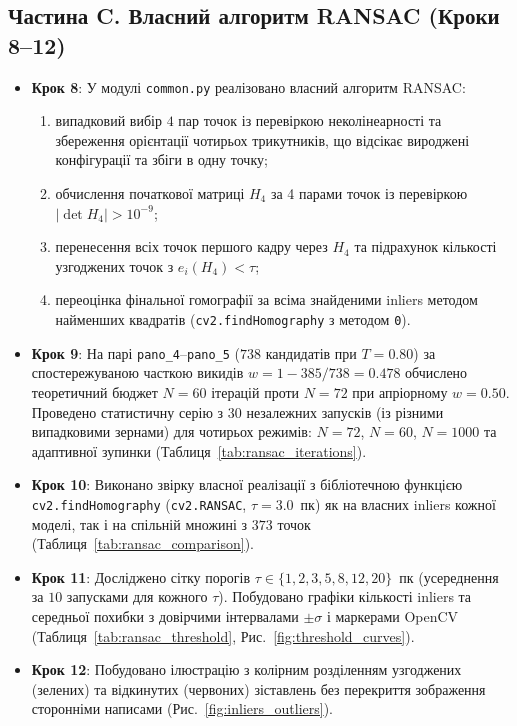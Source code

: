 \documentclass[14pt, a4paper]{extarticle}
\begin{document}
\subsection{Частина C. Власний алгоритм RANSAC (Кроки 8--12)}
\begin{itemize}
    \item \textbf{Крок 8}: У модулі \texttt{common.py} реалізовано власний алгоритм RANSAC:
    \begin{enumerate}
        \item випадковий вибір $4$ пар точок із перевіркою неколінеарності та збереження орієнтації чотирьох трикутників, що відсікає вироджені конфігурації та збіги в одну точку;
        \item обчислення початкової матриці $H_4$ за 4 парами точок із перевіркою $|\det H_4| > 10^{-9}$;
        \item перенесення всіх точок першого кадру через $H_4$ та підрахунок кількості узгоджених точок з $e_i(H_4) < \tau$;
        \item переоцінка фінальної гомографії за всіма знайденими inliers методом найменших квадратів (\texttt{cv2.findHomography} з методом \texttt{0}).
    \end{enumerate}
    \item \textbf{Крок 9}: На парі \texttt{pano\_4}--\texttt{pano\_5} ($738$ кандидатів при $T=0.80$) за спостережуваною часткою викидів $w = 1 - 385/738 = 0.478$ обчислено теоретичний бюджет $N = 60$ ітерацій проти $N = 72$ при апріорному $w = 0.50$. Проведено статистичну серію з $30$ незалежних запусків (із різними випадковими зернами) для чотирьох режимів: $N=72$, $N=60$, $N=1000$ та адаптивної зупинки (Таблиця~\ref{tab:ransac_iterations}).
    \item \textbf{Крок 10}: Виконано звірку власної реалізації з бібліотечною функцією \texttt{cv2.findHomography} (\texttt{cv2.RANSAC}, $\tau = 3.0$~пк) як на власних inliers кожної моделі, так і на спільній множині з $373$ точок (Таблиця~\ref{tab:ransac_comparison}).
    \item \textbf{Крок 11}: Досліджено сітку порогів $\tau \in \{1, 2, 3, 5, 8, 12, 20\}$~пк (усереднення за $10$ запусками для кожного $\tau$). Побудовано графіки кількості inliers та середньої похибки з довірчими інтервалами $\pm \sigma$ і маркерами OpenCV (Таблиця~\ref{tab:ransac_threshold}, Рис.~\ref{fig:threshold_curves}).
    \item \textbf{Крок 12}: Побудовано ілюстрацію з колірним розділенням узгоджених (зелених) та відкинутих (червоних) зіставлень без перекриття зображення сторонніми написами (Рис.~\ref{fig:inliers_outliers}).
\end{itemize}
\end{document}
